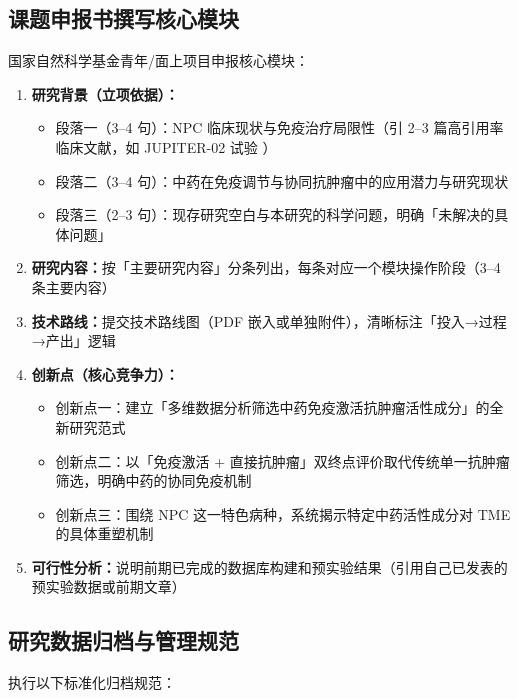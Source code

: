 \documentclass[12pt,a4paper,twoside]{article}
\begin{document}
\subsection{课题申报书撰写核心模块}
\label{sec:module8_grant}

国家自然科学基金青年/面上项目申报核心模块：

\begin{enumerate}
  \item \textbf{研究背景（立项依据）：}
    \begin{itemize}
      \item 段落一（3--4 句）：NPC 临床现状与免疫治疗局限性（引 2--3 篇高引用率临床文献，如 JUPITER-02 试验 \cite{mai2021toripalimab}）
      \item 段落二（3--4 句）：中药在免疫调节与协同抗肿瘤中的应用潜力与研究现状
      \item 段落三（2--3 句）：现存研究空白与本研究的科学问题，明确「未解决的具体问题」
    \end{itemize}
  \item \textbf{研究内容：}按「主要研究内容」分条列出，每条对应一个模块操作阶段（3--4 条主要内容）
  \item \textbf{技术路线：}提交技术路线图（PDF 嵌入或单独附件），清晰标注「投入→过程→产出」逻辑
  \item \textbf{创新点（核心竞争力）：}
    \begin{itemize}
      \item 创新点一：建立「多维数据分析筛选中药免疫激活抗肿瘤活性成分」的全新研究范式
      \item 创新点二：以「免疫激活 + 直接抗肿瘤」双终点评价取代传统单一抗肿瘤筛选，明确中药的协同免疫机制
      \item 创新点三：围绕 NPC 这一特色病种，系统揭示特定中药活性成分对 TME 的具体重塑机制
    \end{itemize}
  \item \textbf{可行性分析：}说明前期已完成的数据库构建和预实验结果（引用自己已发表的预实验数据或前期文章）
\end{enumerate}

\subsection{研究数据归档与管理规范}
\label{sec:module8_archive}

执行以下标准化归档规范：
\end{document}
